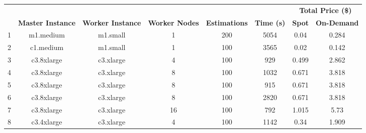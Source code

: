 \begin{table}[h]
\centering
\begin{adjustbox}{width=1\textwidth}
\begin{tabular}{cccccccc}
 &  &  &  &  &  & \multicolumn{2}{c}{\textbf{Total Price (\$)}} \\ \cline{7-8} 
\textbf{} & \textbf{Master Instance} & \textbf{Worker Instance} & \textbf{Worker Nodes} & \textbf{Estimations} & \multicolumn{1}{c|}{\textbf{Time (s)}} & \multicolumn{1}{c|}{\textbf{Spot}} & \multicolumn{1}{c|}{\textbf{On-Demand}} \\ \cline{2-8} 
\multicolumn{1}{c|}{1} & \multicolumn{1}{c|}{m1.medium} & \multicolumn{1}{c|}{m1.small} & \multicolumn{1}{c|}{1} & \multicolumn{1}{c|}{200} & \multicolumn{1}{c|}{5054} & \multicolumn{1}{c|}{0.04} & \multicolumn{1}{c|}{0.284} \\ \cline{2-8} 
\multicolumn{1}{c|}{2} & \multicolumn{1}{c|}{c1.medium} & \multicolumn{1}{c|}{m1.small} & \multicolumn{1}{c|}{1} & \multicolumn{1}{c|}{100} & \multicolumn{1}{c|}{3565} & \multicolumn{1}{c|}{0.02} & \multicolumn{1}{c|}{0.142} \\ \cline{2-8} 
\multicolumn{1}{c|}{3} & \multicolumn{1}{c|}{c3.8xlarge} & \multicolumn{1}{c|}{c3.xlarge} & \multicolumn{1}{c|}{4} & \multicolumn{1}{c|}{100} & \multicolumn{1}{c|}{929} & \multicolumn{1}{c|}{0.499} & \multicolumn{1}{c|}{2.862} \\ \cline{2-8} 
\multicolumn{1}{c|}{4} & \multicolumn{1}{c|}{c3.8xlarge} & \multicolumn{1}{c|}{c3.xlarge} & \multicolumn{1}{c|}{8} & \multicolumn{1}{c|}{100} & \multicolumn{1}{c|}{1032} & \multicolumn{1}{c|}{0.671} & \multicolumn{1}{c|}{3.818} \\ \cline{2-8} 
\multicolumn{1}{c|}{5} & \multicolumn{1}{c|}{c3.8xlarge} & \multicolumn{1}{c|}{c3.xlarge} & \multicolumn{1}{c|}{8} & \multicolumn{1}{c|}{100} & \multicolumn{1}{c|}{915} & \multicolumn{1}{c|}{0.671} & \multicolumn{1}{c|}{3.818} \\ \cline{2-8} 
\multicolumn{1}{c|}{6} & \multicolumn{1}{c|}{c3.8xlarge} & \multicolumn{1}{c|}{c3.xlarge} & \multicolumn{1}{c|}{8} & \multicolumn{1}{c|}{100} & \multicolumn{1}{c|}{2820} & \multicolumn{1}{c|}{0.671} & \multicolumn{1}{c|}{3.818} \\ \cline{2-8} 
\multicolumn{1}{c|}{7} & \multicolumn{1}{c|}{c3.8xlarge} & \multicolumn{1}{c|}{c3.xlarge} & \multicolumn{1}{c|}{16} & \multicolumn{1}{c|}{100} & \multicolumn{1}{c|}{792} & \multicolumn{1}{c|}{1.015} & \multicolumn{1}{c|}{5.73} \\ \cline{2-8} 
\multicolumn{1}{c|}{8} & \multicolumn{1}{c|}{c3.4xlarge} & \multicolumn{1}{c|}{c3.xlarge} & \multicolumn{1}{c|}{4} & \multicolumn{1}{c|}{100} & \multicolumn{1}{c|}{1142} & \multicolumn{1}{c|}{0.34} & \multicolumn{1}{c|}{1.909} \\ \cline{2-8} 

\end{tabular}
\end{adjustbox}
\end{table}
